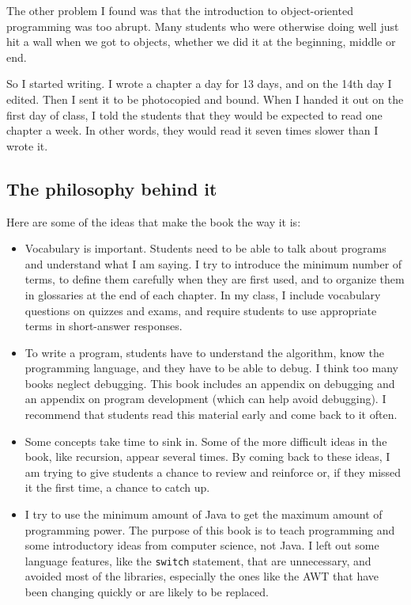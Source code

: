 \documentclass[12pt]{book}
\theoremstyle{exercise}
\begin{document}
The other problem I found was that the introduction to object-oriented
programming was too abrupt.  Many students who were otherwise
doing well just hit a wall when we got to objects, whether we did
it at the beginning, middle or end.

So I started writing.  I wrote a chapter a day for 13 days, and on
the 14th day I edited.  Then I sent it to be photocopied and bound.
When I handed it out on the first day of class, I told the students
that they would be expected to read one chapter a week.  In other
words, they would read it seven times slower than I wrote it.


\subsection*{The philosophy behind it}

Here are some of the ideas that make the book the way it is:

\begin{itemize}

\item Vocabulary is important.  Students need to be able to talk
about programs and understand what I am saying.  I try to
introduce the minimum number of terms, to define them carefully
when they are first used, and to organize them in glossaries
at the end of each chapter.  In my class, I include vocabulary
questions on quizzes and exams, and require students to use
appropriate terms in short-answer responses.

\item To write a program, students have to understand the
algorithm, know the programming language, and they have to be
able to debug.  I think too many books neglect debugging.  This
book includes an appendix on debugging and an appendix on program
development (which can help avoid debugging).  I recommend that
students read this material early and come back to it often.

\item Some concepts take time to sink in.  Some of the more
difficult ideas in the book, like recursion, appear several times.
By coming back to these ideas, I am trying to give students a
chance to review and reinforce or, if they missed it the first time,
a chance to catch up.

\item I try to use the minimum amount of Java to get the
maximum amount of programming power.  The purpose of this book
is to teach programming and some introductory ideas from computer
science, not Java.  I left out some language features, like
the {\tt switch} statement, that are unnecessary, and avoided
most of the libraries, especially the ones like the AWT that have been
changing quickly or are likely to be replaced.

\end{itemize}
\end{document}
